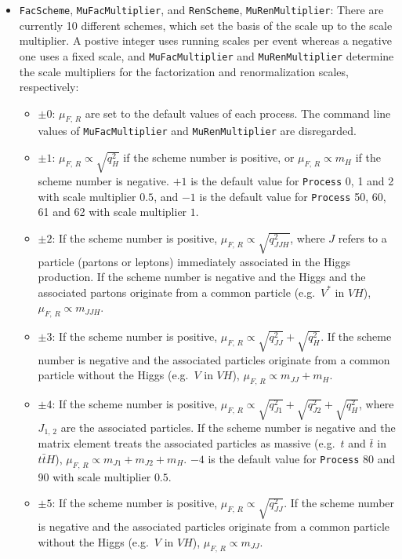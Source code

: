 \documentclass[aps,superscriptaddress,nofootinbib]{revtex4}
\newcommand{\eg}{e.g.~}
\begin{document}
\begin{itemize}
\item \verb|FacScheme|, \verb|MuFacMultiplier|, and \verb|RenScheme|, \verb|MuRenMultiplier|: There are currently 10 different schemes, which set the basis of the scale up to the scale multiplier. A postive integer uses running scales per event whereas a negative one uses a fixed scale, and \verb|MuFacMultiplier| and \verb|MuRenMultiplier| determine the scale multipliers for the factorization and renormalization scales, respectively:
     \begin{itemize}
     \item $\pm0$: $\mu_{F,\,R}$ are set to the default values of each process. The command line values of \verb|MuFacMultiplier| and \verb|MuRenMultiplier| are disregarded.
     \item $\pm1$: $\mu_{F,\,R} \propto \sqrt{q^2_H}$ if the scheme number is positive, or $\mu_{F,\,R} \propto m_H$ if the scheme number is negative. $+1$ is the default value for \verb|Process| 0, 1 and 2 with scale multiplier $0.5$, and  $-1$ is the default value for \verb|Process| 50, 60, 61 and 62 with scale multiplier $1$.
     \item $\pm2$: If the scheme number is positive, $\mu_{F,\,R} \propto \sqrt{q^2_{JJH}}$, where $J$ refers to a particle (partons or leptons) immediately associated in the Higgs production. If the scheme number is negative and the Higgs and the associated partons originate from a common particle (\eg $V^{*}$ in $VH$), $\mu_{F,\,R} \propto m_{JJH}$.
     \item $\pm3$: If the scheme number is positive, $\mu_{F,\,R} \propto \sqrt{q^2_{JJ}}+\sqrt{q^2_{H}}$. If the scheme number is negative and the associated particles originate from a common particle without the Higgs (\eg $V$ in $VH$), $\mu_{F,\,R} \propto m_{JJ}+m_{H}$.
     \item $\pm4$: If the scheme number is positive, $\mu_{F,\,R} \propto \sqrt{q^2_{J1}}+\sqrt{q^2_{J2}}+\sqrt{q^2_{H}}$, where $J_{1,\,2}$ are the associated particles. If the scheme number is negative and the matrix element treats the associated particles as massive (\eg $t$ and $\bar{t}$ in $t\bar{t}H$), $\mu_{F,\,R} \propto m_{J1}+m_{J2}+m_{H}$.  $-4$ is the default value for \verb|Process| 80 and 90 with scale multiplier $0.5$.
     \item $\pm5$: If the scheme number is positive, $\mu_{F,\,R} \propto \sqrt{q^2_{JJ}}$. If the scheme number is negative and the associated particles originate from a common particle without the Higgs (\eg $V$ in $VH$), $\mu_{F,\,R} \propto m_{JJ}$.

\end{itemize}
\end{itemize}
\end{document}
